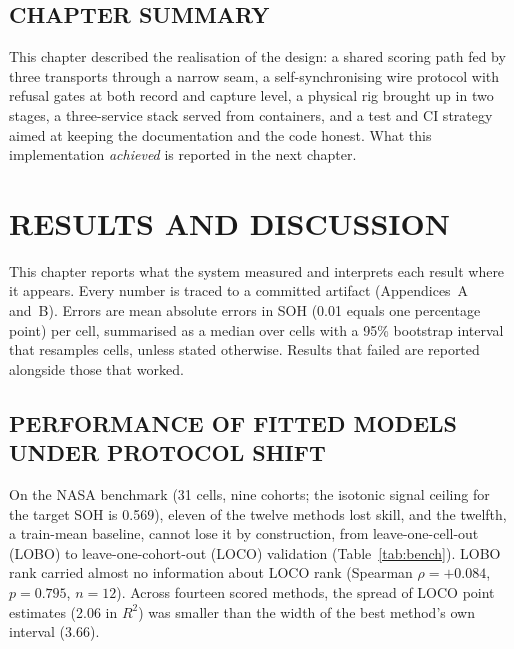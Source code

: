\documentclass[12pt,a4paper]{amritareport}
\begin{document}
\section{CHAPTER SUMMARY}

This chapter described the realisation of the design: a shared scoring path fed by three transports through a narrow seam, a self-synchronising wire protocol with refusal gates at both record and capture level, a physical rig brought up in two stages, a three-service stack served from containers, and a test and CI strategy aimed at keeping the documentation and the code honest. What this implementation \emph{achieved} is reported in the next chapter.

\chapter{RESULTS AND DISCUSSION}
\label{ch:results}

This chapter reports what the system measured and interprets each result where it appears. Every number is traced to a committed artifact (Appendices~A and~B). Errors are mean absolute errors in SOH (0.01 equals one percentage point) per cell, summarised as a median over cells with a 95\% bootstrap interval that resamples cells, unless stated otherwise. Results that failed are reported alongside those that worked.

\section{PERFORMANCE OF FITTED MODELS UNDER PROTOCOL SHIFT}
\label{sec:res-bench}

On the NASA benchmark (31 cells, nine cohorts; the isotonic signal ceiling for the target SOH is 0.569), eleven of the twelve methods lost skill, and the twelfth, a train-mean baseline, cannot lose it by construction, from leave-one-cell-out (LOBO) to leave-one-cohort-out (LOCO) validation (Table~\ref{tab:bench}). LOBO rank carried almost no information about LOCO rank (Spearman $\rho = +0.084$, $p = 0.795$, $n = 12$). Across fourteen scored methods, the spread of LOCO point estimates (2.06 in $R^2$) was smaller than the width of the best method's own interval (3.66).
\end{document}
